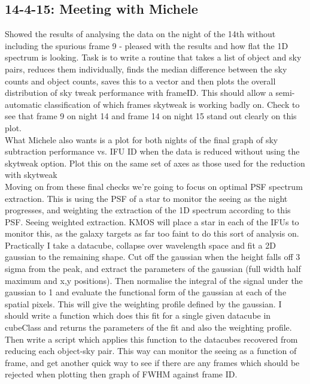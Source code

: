\documentclass{literature}
\begin{document}
\subsection{14-4-15: Meeting with Michele}
Showed the results of analysing the data on the night of the 14th without including the spurious frame 9 - pleased with the results and how flat the 1D spectrum is looking. Task is to write a routine that takes a list of object and sky pairs, reduces them individually, finds the median difference between the sky counts and object counts, saves this to a vector and then plots the overall distribution of sky tweak performance with frameID. This should allow a semi-automatic classification of which frames skytweak is working badly on. Check to see that frame 9 on night 14 and frame 14 on night 15 stand out clearly on this plot. \\ 
What Michele also wants is a plot for both nights of the final graph of sky subtraction performance vs. IFU ID when the data is reduced without using the skytweak option. Plot this on the same set of axes as those used for the reduction with skytweak \\ 

Moving on from these final checks we're going to focus on optimal PSF spectrum extraction. This is using the PSF of a star to monitor the seeing as the night progresses, and weighting the extraction of the 1D spectrum according to this PSF. Seeing weighted extraction. KMOS will place a star in each of the IFUs to monitor this, as the galaxy targets as far too faint to do this sort of analysis on. Practically I take a datacube, collapse over wavelength space and fit a 2D gaussian to the remaining shape. Cut off the gaussian when the height falls off 3 sigma from the peak, and extract the parameters of the gaussian (full width half maximum and x,y positions). Then normalise the integral of the signal under the gaussian to 1 and evaluate the functional form of the gaussian at each of the spatial pixels. This will give the weighting profile defined by the gaussian. I should write a function which does this fit for a single given datacube in cubeClass and returns the parameters of the fit and also the weighting profile. Then write a script which applies this function to the datacubes recovered from reducing each object-sky pair. This way can monitor the seeing as a function of frame, and get another quick way to see if there are any frames which should be rejected when plotting then graph of FWHM against frame ID.  \\ 
\end{document}
